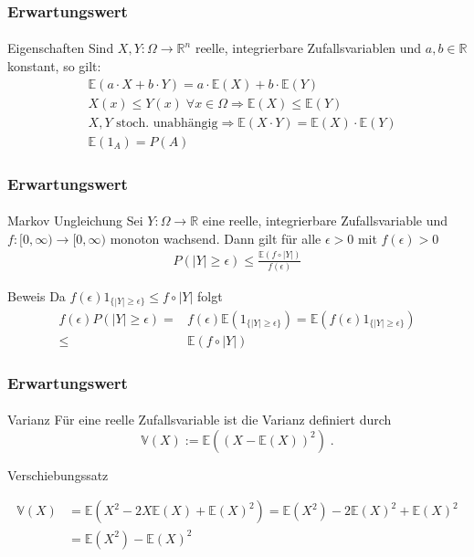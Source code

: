 \documentclass{beamer}
\begin{document}
\begin{frame}
    \frametitle{Erwartungswert}
\framesubtitle{}
\begin{block}{Eigenschaften}
Sind $X,Y : \Omega \to \mathbb{R}^n$   reelle, integrierbare  Zufallsvariablen und $a,b \in \mathbb{R}$ konstant, so gilt:
\begin{align*}
& \mathbb{E}(a \cdot X + b \cdot Y) = a \cdot \mathbb{E}(X) + b \cdot \mathbb{E}(Y) \\
& X(x) \leq Y(x) \;  \forall x \in \Omega \Rightarrow \mathbb{E}(X) \leq \mathbb{E}(Y) \\
& X ,Y \text{ stoch. unabhängig} \Rightarrow   \mathbb{E}(X \cdot Y) =  \mathbb{E}(X) \cdot  \mathbb{E}(Y) \\
& \mathbb{E} (1_A) = P (A)
\end{align*}
\end{block}
 \end{frame}


\begin{frame}
    \frametitle{Erwartungswert}
\framesubtitle{}
\begin{block}{Markov Ungleichung}
Sei $Y : \Omega \to \mathbb{R}$  eine  reelle, integrierbare  Zufallsvariable und $f : [0, \infty) \to [0, \infty)$ monoton wachsend.
Dann gilt für alle $\epsilon > 0$ mit $f(\epsilon) > 0$
\begin{align*}
P (|Y |  \geq \epsilon) \leq \frac{\mathbb{E} (f \circ |Y|)}{f(\epsilon)}
\end{align*}
\end{block}
\begin{block}{Beweis}
Da $f(\epsilon) 1_{\{ |Y| \geq  \epsilon \} } \leq f \circ |Y|$ folgt
\begin{align*}
f(\epsilon) P(|Y| \geq \epsilon) = & f(\epsilon) \mathbb{E}(1_{\{ |Y| \geq  \epsilon \} }) = \mathbb{E}( f(\epsilon) 1_{\{ |Y| \geq  \epsilon \} }) \\
\leq & \mathbb{E}( f \circ |Y|)
\end{align*}
\end{block}
 \end{frame}


\begin{frame}
    \frametitle{Erwartungswert}
\framesubtitle{}
\begin{block}{Varianz}
Für eine reelle Zufallsvariable ist die Varianz definiert durch
$$ \mathbb{V} (X) :=  \mathbb{E}( (X - \mathbb{E}(X))^2) \; .$$
\end{block}
\begin{block}{Verschiebungssatz}

\begin{align*}
 \mathbb{V}(X) & = \mathbb{E}(X^2 - 2X \mathbb{E}(X) + \mathbb{E}(X)^2) = \mathbb{E}(X^2) - 2 \mathbb{E}(X)^2 +  \mathbb{E}(X)^2 \\
& =  \mathbb{E}(X^2) -  \mathbb{E}(X)^2 \\
\end{align*}
\end{block}
 \end{frame}
\end{document}
